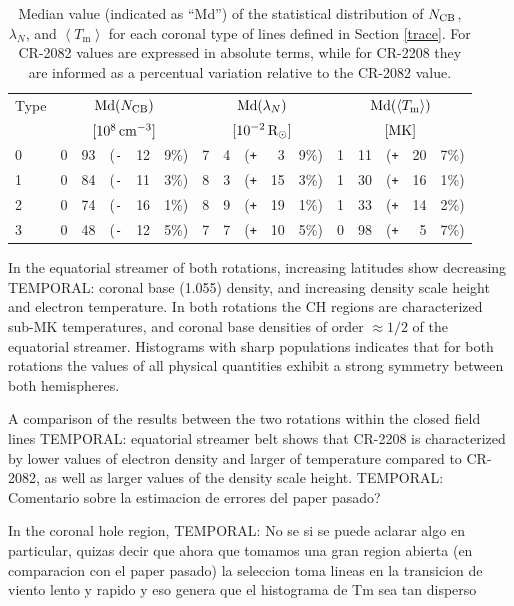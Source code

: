 \documentclass[namedreferences]{solarphysics}
\newcommand{\mrsun}{{\rm R_\odot}}
\newcommand{\med}{{\rm Md}}
\newcommand{\avgTe}{\left<T_\textrm{m}\right>}
\newcommand{\MK}{{\rm MK}}
\newcommand{\lN}{\lambda_N}
\newcommand{\NCB}{N_{\rm CB}}
\newcommand{\aTm}{\left< T_\textrm{m}\right>}
\def\Pl{\texttt{+}}
\def\Mi{\texttt{-}}
\def\temp#1{\textcolor{mygray}{TEMPORAL: #1}}
\begin{document}
\begin{article}
\begin{table}
\begin{tabular}{l r@{.}l@{\hskip 0.05in} r@{\hskip 0.01in} r@{.}l  r@{.}l@{\hskip 0.05in} r@{\hskip 0.01in} r@{.}l r@{.}l@{\hskip 0.05in} r@{\hskip 0.01in} r@{.}l }
\hline
Type    & \multicolumn{5}{c}{$\med(\NCB)$}             & \multicolumn{5}{c}{$\med(\lN)$} & \multicolumn{5}{c}{$\med(\avgTe)$} \\
       & \multicolumn{5}{c}{$[10^8\,{\rm cm}^{-3}]$}  & \multicolumn{5}{c}{$[{\rm 10}^{-2}\,\mrsun]$} & \multicolumn{5}{c}{$[\MK]$} \\
\hline
0  & 0&93 &(\Mi&12&9\%)  &   7&4 &(\Pl&~3&9\%) &   1&11 &(\Pl&20&7\%) \\
1  & 0&84 &(\Mi&11&3\%)  &   8&3 &(\Pl&15&3\%) &   1&30 &(\Pl&16&1\%) \\
2  & 0&74 &(\Mi&16&1\%)  &   8&9 &(\Pl&19&1\%) &   1&33 &(\Pl&14&2\%) \\
3  & 0&48 &(\Mi&12&5\%)  &   7&7 &(\Pl&10&5\%) &   0&98 &(\Pl&~5&7\%) \\
\hline          
\end{tabular}
\caption{Median value (indicated as ``Md'') of the statistical distribution of $\NCB$, $\lN$, and $\aTm$ for each coronal type of lines defined in Section \ref{trace}. For CR-2082 values are expressed in absolute terms, while for CR-2208 they are informed as a percentual variation relative to the CR-2082 value.}
\label{tabla_demt}
\end{table}


In the equatorial streamer of both rotations, increasing latitudes show decreasing \temp{coronal base (1.055)} density, and increasing density scale height and electron temperature. In both rotations the CH regions are characterized sub-MK temperatures, and coronal base densities of order $\approx 1/2$ of the equatorial streamer. Histograms with sharp populations indicates that for both rotations the values of all physical quantities exhibit a strong symmetry between both hemispheres.

A comparison of the results between the two rotations within the closed field lines \temp{equatorial streamer belt} shows that CR-2208 is characterized by lower values of electron density and larger of temperature compared to CR-2082, as well as larger values of the density scale height.
\temp{Comentario sobre la estimacion de errores del paper pasado?}

In the coronal hole region, \temp{No se si se puede aclarar algo en particular, quizas decir que ahora que tomamos una gran region abierta (en comparacion con el paper pasado) la seleccion toma lineas en la transicion de viento lento y rapido y eso genera que el histograma de Tm sea tan disperso}


\end{article}
\end{document}
